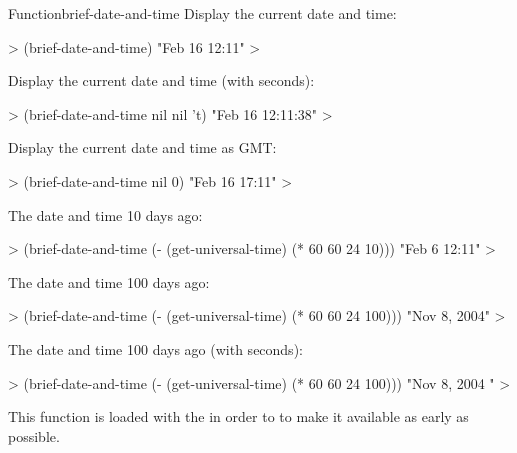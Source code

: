\documentclass[10pt,twoside,english,pdftex]{article}
\begin{document}
\begin{functiondoc}{Function}{brief-date-and-time}{%
     
    \returns{} }
\fnexamples
Display the current date and time: 
%
\W\supp
\begin{example}
  > (brief-date-and-time)
  "Feb 16 12:11"
  >
\end{example}
%
Display the current date and time (with seconds):
%
\W\supp\notpretop
\begin{example}
  > (brief-date-and-time nil nil 't)
  "Feb 16 12:11:38"
  >
\end{example}
%
Display the current date and time as GMT: 
%
\W\supp\notpretop
\begin{example}
  > (brief-date-and-time nil 0)
  "Feb 16 17:11"
  >
\end{example}
%
The date and time 10 days ago:
%
\W\supp\notpretop
\begin{example}
  > (brief-date-and-time (- (get-universal-time) (* 60 60 24 10)))
  "Feb 6 12:11"
  >
\end{example}
%
The date and time 100 days ago:
%
\W\supp\notpretop
\begin{example}
  > (brief-date-and-time (- (get-universal-time) (* 60 60 24 100)))
  "Nov  8, 2004"
  >
\end{example}
%
The date and time 100 days ago (with seconds):
%
\W\supp\notpretop
\begin{example}
  > (brief-date-and-time (- (get-universal-time) (* 60 60 24 100)))
  "Nov  8, 2004   "
  >
\end{example}

\fnnote
{}%
%
%
This function is loaded with the   in order
to to make it available as early as possible.

\end{functiondoc}

\end{document}
